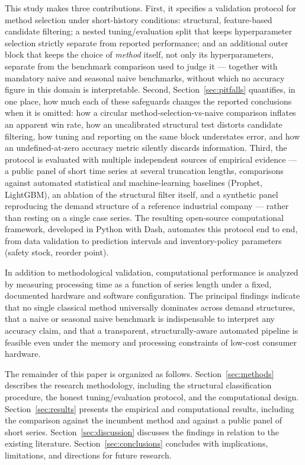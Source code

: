 \documentclass[forecasting,article,submit,pdftex,moreauthors]{Definitions/mdpi}
\begin{document}
This study makes three contributions. First, it specifies a validation protocol for method selection under short-history conditions: structural, feature-based candidate filtering; a nested tuning/evaluation split that keeps hyperparameter selection strictly separate from reported performance; and an additional outer block that keeps the choice of \emph{method} itself, not only its hyperparameters, separate from the benchmark comparison used to judge it --- together with mandatory naive and seasonal naive benchmarks, without which no accuracy figure in this domain is interpretable. Second, Section~\ref{sec:pitfalls} quantifies, in one place, how much each of these safeguards changes the reported conclusions when it is omitted: how a circular method-selection-vs-naive comparison inflates an apparent win rate, how an uncalibrated structural test distorts candidate filtering, how tuning and reporting on the same block understates error, and how an undefined-at-zero accuracy metric silently discards information. Third, the protocol is evaluated with multiple independent sources of empirical evidence --- a public panel of short time series at several truncation lengths, comparisons against automated statistical and machine-learning baselines (Prophet, LightGBM), an ablation of the structural filter itself, and a synthetic panel reproducing the demand structure of a reference industrial company --- rather than resting on a single case series. The resulting open-source computational framework, developed in Python with Dash, automates this protocol end to end, from data validation to prediction intervals and inventory-policy parameters (safety stock, reorder point).

In addition to methodological validation, computational performance is analyzed by measuring processing time as a function of series length under a fixed, documented hardware and software configuration. The principal findings indicate that no single classical method universally dominates across demand structures, that a naive or seasonal naive benchmark is indispensable to interpret any accuracy claim, and that a transparent, structurally-aware automated pipeline is feasible even under the memory and processing constraints of low-cost consumer hardware.

The remainder of this paper is organized as follows. Section~\ref{sec:methods} describes the research methodology, including the structural classification procedure, the honest tuning/evaluation protocol, and the computational design. Section~\ref{sec:results} presents the empirical and computational results, including the comparison against the incumbent method and against a public panel of short series. Section~\ref{sec:discussion} discusses the findings in relation to the existing literature. Section~\ref{sec:conclusions} concludes with implications, limitations, and directions for future research.
\end{document}
